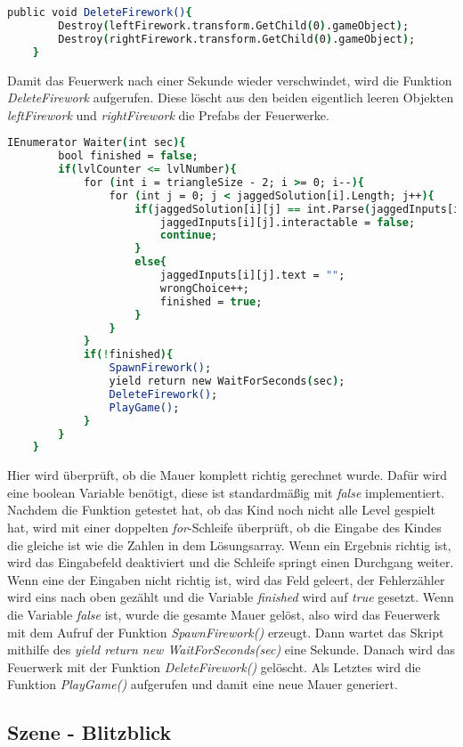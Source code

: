 \begin{lstlisting}[language=csh, caption={Triangle.cs DeleteFirework-Funktion}]
	public void DeleteFirework(){
		Destroy(leftFirework.transform.GetChild(0).gameObject);
		Destroy(rightFirework.transform.GetChild(0).gameObject);
	}
\end{lstlisting}
Damit das Feuerwerk nach einer Sekunde wieder verschwindet, wird die Funktion \textit{DeleteFirework} aufgerufen. Diese löscht aus den beiden eigentlich leeren Objekten \textit{leftFirework} und \textit{rightFirework} die Prefabs der Feuerwerke.\\
\begin{lstlisting}[language=csh, caption={Triangle.cs Waiter-Coroutine}]
	IEnumerator Waiter(int sec){
		bool finished = false;
		if(lvlCounter <= lvlNumber){
			for (int i = triangleSize - 2; i >= 0; i--){
				for (int j = 0; j < jaggedSolution[i].Length; j++){
					if(jaggedSolution[i][j] == int.Parse(jaggedInputs[i][j].text)){
						jaggedInputs[i][j].interactable = false;
						continue;
					}
					else{
						jaggedInputs[i][j].text = "";
						wrongChoice++;
						finished = true;
					}
				}
			}
			if(!finished){
				SpawnFirework();
				yield return new WaitForSeconds(sec);
				DeleteFirework();
				PlayGame();
			}
		}
	}
\end{lstlisting}
Hier wird überprüft, ob die Mauer komplett richtig gerechnet wurde. Dafür wird eine boolean Variable benötigt, diese ist standardmäßig mit \textit{false} implementiert. Nachdem die Funktion getestet hat, ob das Kind noch nicht alle Level gespielt hat, wird mit einer doppelten \textit{for}-Schleife überprüft, ob die Eingabe des Kindes die gleiche ist wie die Zahlen in dem Lösungsarray. Wenn ein Ergebnis richtig ist, wird das Eingabefeld deaktiviert und die Schleife springt einen Durchgang weiter. Wenn eine der Eingaben nicht richtig ist, wird das Feld geleert, der Fehlerzähler wird eins nach oben gezählt und die Variable \textit{finished} wird auf \textit{true} gesetzt. Wenn die Variable \textit{false} ist, wurde die gesamte Mauer gelöst, also wird das Feuerwerk mit dem Aufruf der Funktion \textit{SpawnFirework()} erzeugt. Dann wartet das Skript mithilfe des \textit{yield return new WaitForSeconds(sec)} eine Sekunde. Danach wird das Feuerwerk mit der Funktion \textit{DeleteFirework()} gelöscht. Als Letztes wird die Funktion \textit{PlayGame()} aufgerufen und damit eine neue Mauer generiert.\\
\subsection{Szene - Blitzblick}
